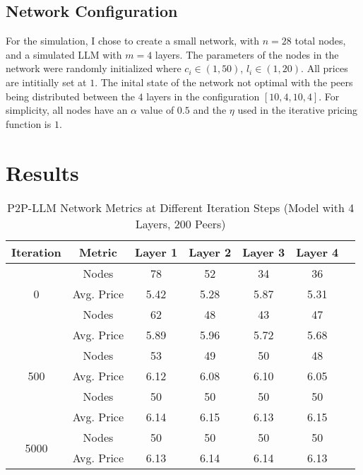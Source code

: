 \documentclass[preprint,twoside,11pt]{article}
\begin{document}
\subsection{Network Configuration}

For the simulation, I chose to create a small network, with $n = 28$ total nodes, and a simulated LLM with $m = 4$ layers.
The parameters of the nodes in the network were randomly initialized
where $c_i \in (1,50)$, $l_i \in (1,20)$. All prices are intitially set at $1$. The inital state of the network not optimal with the peers being distributed between the $4$ layers in the configuration $[10, 4, 10, 4]$.
For simplicity, all nodes have an $\alpha$ value of $0.5$ and the $\eta$ used in the iterative pricing function is $1$.

\section{Results}

\begin{table}[t]
	\centering
	\caption{P2P-LLM Network Metrics at Different Iteration Steps (Model with 4 Layers, 200 Peers)}
	\label{tab:network-metrics}
	\begin{tabular}{ccccccc}
		\toprule
		\textbf{Iteration} & \textbf{Metric} & \textbf{Layer 1} & \textbf{Layer 2} & \textbf{Layer 3} & \textbf{Layer 4} \\
		\midrule
		\multirow{3}{*}{0}
		                   & Nodes           & 78               & 52               & 34               & 36               \\
		                   & Avg. Price      & 5.42             & 5.28             & 5.87             & 5.31             \\
		\midrule
		\multirow{3}{*}{100}
		                   & Nodes           & 62               & 48               & 43               & 47               \\
		                   & Avg. Price      & 5.89             & 5.96             & 5.72             & 5.68             \\
		\midrule
		\multirow{3}{*}{500}
		                   & Nodes           & 53               & 49               & 50               & 48               \\
		                   & Avg. Price      & 6.12             & 6.08             & 6.10             & 6.05             \\
		\midrule
		\multirow{3}{*}{1000}
		                   & Nodes           & 50               & 50               & 50               & 50               \\
		                   & Avg. Price      & 6.14             & 6.15             & 6.13             & 6.15             \\
		\midrule
		\multirow{3}{*}{5000}
		                   & Nodes           & 50               & 50               & 50               & 50               \\
		                   & Avg. Price      & 6.13             & 6.14             & 6.14             & 6.13             \\
		\bottomrule
	\end{tabular}
\end{table}
\end{document}
